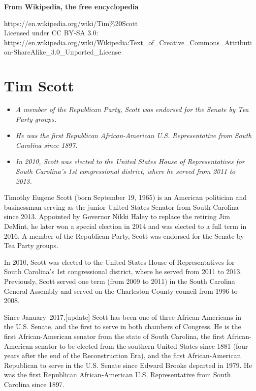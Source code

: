 \textbf{From Wikipedia, the free encyclopedia}

https://en.wikipedia.org/wiki/Tim\%20Scott\\
Licensed under CC BY-SA 3.0:\\
https://en.wikipedia.org/wiki/Wikipedia:Text\_of\_Creative\_Commons\_Attribution-ShareAlike\_3.0\_Unported\_License

\section{Tim Scott}\label{tim-scott}

\begin{itemize}
\item
  \emph{A member of the Republican Party, Scott was endorsed for the
  Senate by Tea Party groups.}
\item
  \emph{He was the first Republican African-American U.S. Representative
  from South Carolina since 1897.}
\item
  \emph{In 2010, Scott was elected to the United States House of
  Representatives for South Carolina's 1st congressional district, where
  he served from 2011 to 2013.}
\end{itemize}

Timothy Eugene Scott (born September 19, 1965) is an American politician
and businessman serving as the junior United States Senator from South
Carolina since 2013. Appointed by Governor Nikki Haley to replace the
retiring Jim DeMint, he later won a special election in 2014 and was
elected to a full term in 2016. A member of the Republican Party, Scott
was endorsed for the Senate by Tea Party groups.

In 2010, Scott was elected to the United States House of Representatives
for South Carolina's 1st congressional district, where he served from
2011 to 2013. Previously, Scott served one term (from 2009 to 2011) in
the South Carolina General Assembly and served on the Charleston County
council from 1996 to 2008.

Since January~2017,{[}update{]} Scott has been one of three
African-Americans in the U.S. Senate, and the first to serve in both
chambers of Congress. He is the first African-American senator from the
state of South Carolina, the first African-American senator to be
elected from the southern United States since 1881 (four years after the
end of the Reconstruction Era), and the first African-American
Republican to serve in the U.S. Senate since Edward Brooke departed in
1979. He was the first Republican African-American U.S. Representative
from South Carolina since 1897.

